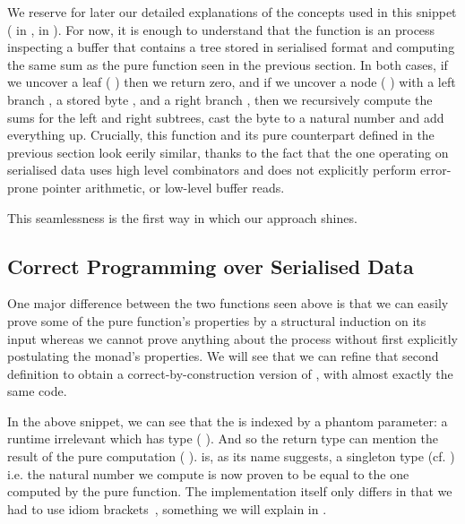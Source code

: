We reserve for later our detailed explanations of the concepts
used in this snippet
( in ,
 in ).
%
For now, it is enough to understand that the function
is an  process
inspecting a buffer that contains a tree stored in serialised format
and computing the same sum as the pure function seen in the previous section.
%
In both cases, if we uncover a leaf
({ \IdrisData{\#}} \IdrisKeyword{\KatlaUnderscore{}})
then we return zero,
and if we uncover a node
({ \IdrisData{\#}}  \IdrisData{\#}  \IdrisData{\#} )
with
a left branch ,
a stored byte ,
and a right branch ,
then we recursively compute the sums for the left and right subtrees,
cast the byte to a natural number and add everything up.
%
Crucially, this function and its pure counterpart defined in the previous
section look eerily similar, thanks to the fact that the one operating on
serialised data uses high level combinators and does not explicitly
perform error-prone pointer arithmetic, or low-level buffer reads.

This seamlessness is the first way in which our approach shines.

\subsection{Correct Programming over Serialised Data}

One major difference between the two functions seen above is that
we can easily prove some of the pure function's properties by a structural
induction on its input whereas we
cannot prove anything about the  process without first
explicitly postulating the  monad's properties.
%
We will see that we can refine that second definition to obtain
a correct-by-construction version of
, with almost exactly the same code.


In the above snippet, we can see that the  is indexed
by a phantom parameter: a runtime irrelevant  which has type
( ).
%
And so the return type can mention the result of the pure computation
( ).
%
 is, as its name suggests, a singleton type
(cf. )
i.e. the natural number we compute is now proven to be equal to the
one computed by the pure  function.
%
The implementation itself only differs in that we had to use idiom
brackets~\citep{DBLP:journals/jfp/McbrideP08}, something we will explain
in .


